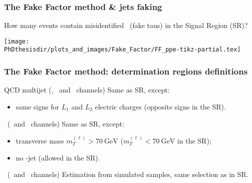 \begin{frame}
\frametitle{The Fake Factor method \& jets faking \tauh}

\manip How many events contain misidentified \tauh\ (fake taus) in the Signal Region (SR)?


\begin{center}
\texttt{[image: \\PhDthesisdir/plots\_and\_images/Fake\_Factor/FF\_ppe-tikz-partial.tex]}
\end{center}
\end{frame}



\begin{frame}
\frametitle{The Fake Factor method: determination regions definitions}

\begin{block}{QCD multijet (\tauh\tauh, \mu\tauh\ and \ele\tauh\ channels)}
Same as SR, except:
\begin{itemize}
\item same signs for $L_1$ and $L_2$ electric charges (opposite signs in the SR).
\end{itemize}
\end{block}

\pause\vfill

\begin{block}{\Wjets\ (\mu\tauh\ and \ele\tauh\ channels)}
Same as SR, except:
\begin{itemize}
\item transverse mass $m_T^{(\ell)}>\SI{70}{\GeV}$ ($m_T^{(\ell)}<\SI{70}{\GeV}$ in the SR);
\item no \quarkb-jet (allowed in the SR).
\end{itemize}
\end{block}

\pause\vfill

\begin{block}{\ttbar\ (\mu\tauh\ and \ele\tauh\ channels)}
Estimation from simulated samples, same selection as in SR.
\end{block}

\vfill
\end{frame}

%
%

